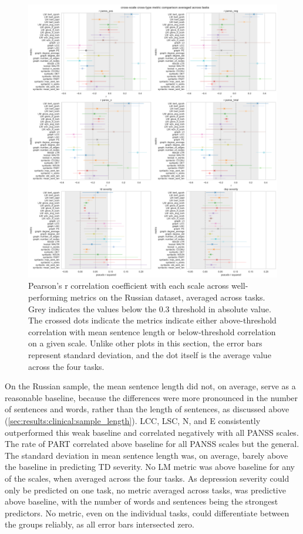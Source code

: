 \begin{figure}[ht!]
    \includegraphics[width=1.1\textwidth, center]{Figures/chapter_4/compare/ru_cross_task_average_compare_r.png} 
\captionsetup{width=\textwidth}
\caption[Metric Comparison: Russian]{\label{fig:results:comp:ru}  Pearson's r correlation coefficient with each scale across well-performing metrics on the Russian dataset, averaged across tasks. Grey indicates the values below the 0.3 threshold in absolute value. The crossed dots indicate the metrics indicate either above-threshold correlation with mean sentence length or below-threshold correlation on a given scale. 
Unlike other plots in this section, the error bars represent standard deviation, and the dot itself is the average value across the four tasks.}
\end{figure}

On the Russian sample, the mean sentence length did not, on average, serve as a reasonable baseline, because the differences were more pronounced in the number of sentences and words, rather than the length of sentences, as discussed above (\ref{sec:results:clinical:sample_length}). LCC, LSC, N, and E consistently outperformed this weak baseline and correlated negatively with all PANSS scales. The rate of PART correlated above baseline for all PANSS scales but the general. The standard deviation in mean sentence length was, on average, barely above the baseline in predicting TD severity. No LM metric was above baseline for any of the scales, when averaged across the four tasks. As depression severity could only be predicted on one task, no metric averaged across tasks, was predictive above baseline, with the number of words and sentences being the strongest predictors. No metric, even on the individual tasks, could differentiate between the groups reliably, as all error bars intersected zero.

